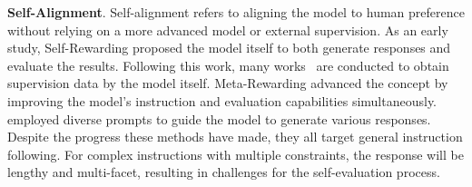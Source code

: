 \noindent\textbf{Self-Alignment}.
Self-alignment refers to aligning the model to human preference without relying on a more advanced model or external supervision.
As an early study, Self-Rewarding \cite{yuan2024selfrewardinglanguagemodels} proposed the model itself to both generate responses and evaluate the results. 
Following this work, many works~\cite{liu-etal-2024-direct,chen2024dog,chen2024bootstrapping,pang2024self,meng2024simpo} are conducted to obtain supervision data by the model itself. Meta-Rewarding \cite{wu2024metarewardinglanguagemodelsselfimproving} advanced the concept by improving the model's instruction and evaluation capabilities simultaneously. 
\citet{liu-etal-2024-direct} employed diverse prompts to guide the model to generate various responses.
Despite the progress these methods have made, they all target general instruction following. For complex instructions with multiple constraints, the response will be lengthy and multi-facet, resulting in challenges for the self-evaluation process. 

